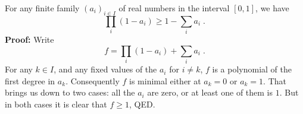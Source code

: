 \documentclass[12pt]{article}
\begin{document}
For any finite family $(a_i)_{i\in I}$ of real numbers in the interval
$[0,1]$, we have
$$\prod_i(1-a_i)\ge 1-\sum_ia_i\;.$$
\textbf{Proof: } Write
$$f=\prod_i(1-a_i)+\sum_ia_i\;.$$
For any $k\in I$, and any fixed values of the $a_i$ for $i\ne k$,
$f$ is a polynomial of the first degree in $a_k$.
Consequently $f$ is minimal either at $a_k=0$ or $a_k=1$.
That brings us down to two cases: all the $a_i$ are zero, or at least
one of them is $1$. But in both cases it is clear that $f\ge 1$, QED.
\end{document}
